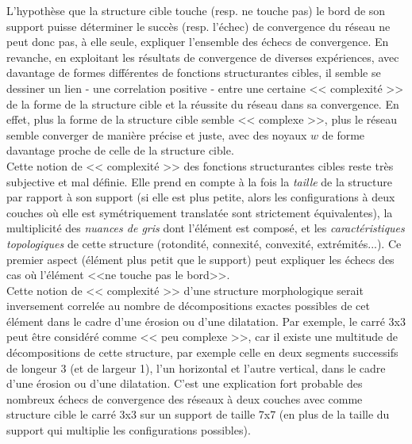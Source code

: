 \vspace{-3.0mm}
L'hypothèse que la structure cible touche (resp. ne touche pas) le bord de son support puisse déterminer le succès (resp. l'échec) de convergence du réseau ne peut donc pas, à elle seule, expliquer l'ensemble des échecs de convergence. En revanche, en exploitant les résultats de convergence de diverses expériences, avec davantage de formes différentes de fonctions structurantes cibles, il semble se dessiner un lien - une correlation positive - entre une certaine << complexité >> de la forme de la structure cible et la réussite du réseau dans sa convergence. En effet, plus la forme de la structure cible semble << complexe >>, plus le réseau semble converger de manière précise et juste, avec des noyaux $w$ de forme davantage proche de celle de la structure cible. \\

\vspace{-2.0mm}
\noindent Cette notion de << complexité >> des fonctions structurantes cibles reste très subjective et mal définie. Elle prend en compte à la fois la \textit{taille} de la structure par rapport à son support (si elle est plus petite, alors les configurations à deux couches où elle est symétriquement translatée sont strictement équivalentes), la multiplicité des \textit{nuances de gris} dont l'élément est composé, et les \textit{caractéristiques topologiques} de cette structure (rotondité, connexité, convexité, extrémités...). Ce premier aspect (élément plus petit que le support) peut expliquer les échecs des cas où l'élément <<ne touche pas le bord>>. \\

\vspace{-2.0mm}
\noindent Cette notion de << complexité >> d'une structure morphologique serait inversement correlée au nombre de décompositions exactes possibles de cet élément dans le cadre d'une érosion ou d'une dilatation. Par exemple, le carré 3x3 peut être considéré comme << peu complexe >>, car il existe une multitude de décompositions de cette structure, par exemple celle en deux segments successifs de longeur 3 (et de largeur 1), l'un horizontal et l'autre vertical, dans le cadre d'une érosion ou d'une dilatation. C'est une explication fort probable des nombreux échecs de convergence des réseaux à deux couches avec comme structure cible le carré 3x3 sur un support de taille 7x7 (en plus de la taille du support qui multiplie les configurations possibles).


